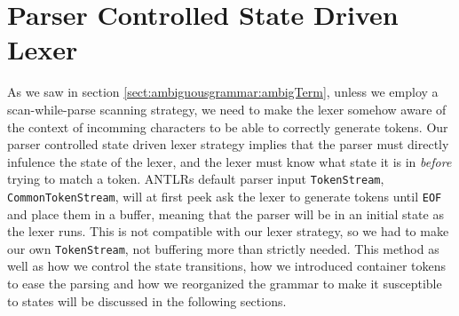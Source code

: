 \section{Parser Controlled State Driven Lexer}
As we saw in section \ref{sect:ambiguousgrammar:ambigTerm}, unless we employ a scan-while-parse scanning strategy, we need to make the lexer somehow aware of the context of incomming characters to be able to correctly generate tokens. Our parser controlled state driven lexer strategy implies that the parser must directly infulence the state of the lexer, and the lexer must know what state it is in \emph{before} trying to match a token. ANTLRs default parser input \verb!TokenStream!, \verb!CommonTokenStream!, will at first peek ask the lexer to generate tokens until \verb!EOF! and place them in a buffer, meaning that the parser will be in an initial state as the lexer runs. This is not compatible with our lexer strategy, so we had to make our own \verb!TokenStream!, not buffering more than strictly needed. This method as well as how we control the state transitions, how we introduced container tokens to ease the parsing and how we reorganized the grammar to make it susceptible to states will be discussed in the following sections.

